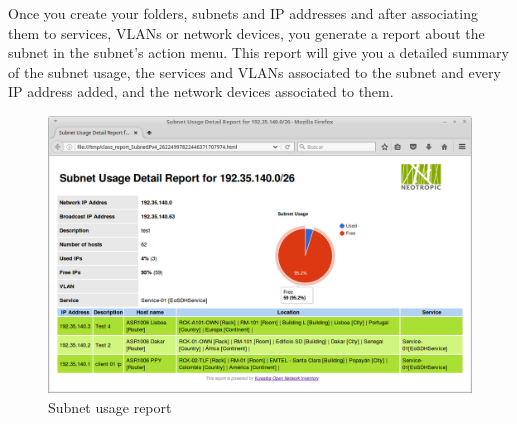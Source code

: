 \documentclass[a4paper]{article}
\begin{document}
		\newpage
		Once you create your folders, subnets and IP addresses and after associating them to services, VLANs or network devices, you generate a report about the subnet in the subnet's action menu. This report will give you a detailed summary of the subnet usage, the services and VLANs associated to the subnet and every IP address added, and the network devices associated to them.
		\begin{figure}[h!]
			\centering
			\includegraphics[width=1.1\linewidth]{img/ipam_report_subnet_usage_detail.png}
			\caption{Subnet usage report}
			\label{fig:ipam_report_subnet_usage_detail}
		\end{figure} 
		
		\clearpage
\end{document}
